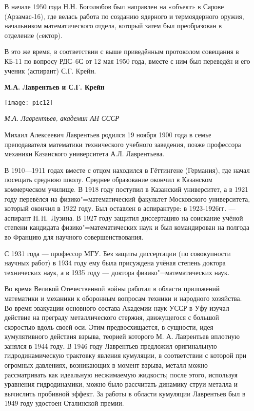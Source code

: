 В начале 1950 года Н.Н. Боголюбов был направлен на «объект» в Сарове (Арзамас-16), где велась работа по созданию ядерного и термоядерного оружия, начальником математического отдела, который затем был преобразован в отделение (cектор).

В это же время, в соответствии с выше приведённым протоколом совещания в КБ-11 по вопросу РДС–6С от 12 мая 1950 года, вместе с ним был переведён и его ученик (аспирант) С.Г. Крейн.

\begin{center}
{\bf М.А. Лаврентьев и С.Г. Крейн}

\vspace{3mm}

\texttt{[image: pic12]}


{\it М.А. Лаврентьев, академик АН СССР}
\end{center}

Михаил Алексеевич Лаврентьев родился 19 ноября 1900 года в семье преподавателя математики технического учебного заведения, позже профессора механики Казанского университета А.Л. Лаврентьева.

В 1910—1911 годах вместе с отцом находился в Гёттингене (Германия), где начал посещать среднюю школу. Среднее образование окончил в Казанском коммерческом училище. В 1918 году поступил в Казанский университет, а в 1921 году перевёлся на физико"=математический факультет Московского университета, который окончил в 1922 году. Был оставлен в аспирантуре: в 1923-1926гг. — аспирант Н.\,Н.~Лузина. В 1927 году защитил диссертацию на соискание учёной степени кандидата физико"=математических наук и был командирован на полгода во Францию для научного совершенствования.

С 1931 года — профессор МГУ. Без защиты диссертации (по совокупности научных работ) в 1934 году ему была присуждена учёная степень доктора технических наук, а в 1935 году — доктора физико"=математических наук.

Во время Великой Отечественной войны  работал в области приложений математики и механики к оборонным вопросам техники и народного хозяйства. Во время эвакуации основного состава Академии наук УССР в Уфу изучал действие на преграду металлического стержня, движущегося с большой скоростью вдоль своей оси. Этим предвосхищается, в сущности, идея кумулятивного действия взрыва, теорией которого М. А. Лаврентьев вплотную занялся в 1944 году. В 1946 году Лаврентьев предложил оригинальную гидродинамическую трактовку явления кумуляции, в соответствии с которой при огромных давлениях, возникающих в момент взрыва, металл можно рассматривать как идеальную несжимаемую жидкость; после этого, используя уравнения гидродинамики, можно было рассчитать динамику струи металла и вычислить пробивной эффект. За работы в области кумуляции Лаврентьев был в 1949 году удостоен Сталинской премии.

